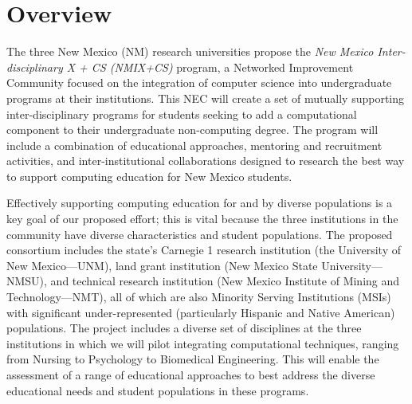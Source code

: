 \section{Overview}
\label{sec:overview}

The three New Mexico (NM) research universities propose the \emph{New Mexico Inter-disciplinary X + CS (NMIX+CS)} program, a Networked Improvement Community focused on the integration of computer science into undergraduate programs at their institutions. This NEC will create a set of mutually supporting inter-disciplinary programs for students seeking to add a computational component to their undergraduate non-computing degree. The program will include a combination of educational approaches, mentoring and recruitment activities, and inter-institutional collaborations designed to research the best way to support computing education for New Mexico students.

Effectively supporting computing education for and by diverse populations is a key goal of our proposed effort; this is vital because the three institutions in the community have diverse characteristics and student populations.  The proposed consortium includes the state's Carnegie 1 research institution (the University of New Mexico---UNM), land grant institution (New Mexico State University---NMSU), and technical research institution (New Mexico Institute of Mining and Technology---NMT), all of which
are also Minority Serving Institutions (MSIs) with significant under-represented (particularly Hispanic
and Native American) populations. The project includes a diverse set of disciplines at the three institutions in which we will pilot integrating computational techniques, ranging from Nursing to Psychology to Biomedical Engineering. This will enable the assessment of a range of educational approaches to best address the diverse educational needs and student populations in these programs.


